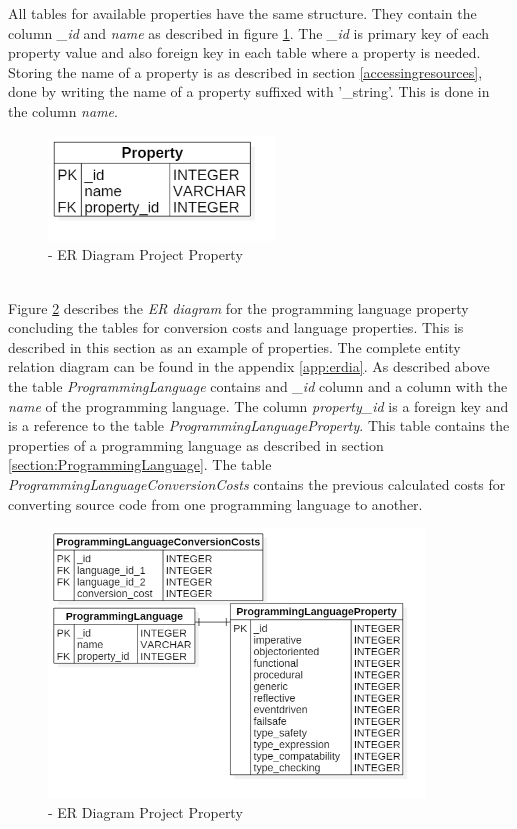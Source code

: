 All tables for available properties have the same structure. They contain the column \textit{\_id} and \textit{name} as described in figure \ref{fig:erproperty}. The \textit{\_id} is primary key of each property value and also foreign key in each table where a property is needed. Storing the name of a property is as described in section \ref{accessingresources}, done by writing the name of a property suffixed with '\_string'. This is done in the column \textit{name}.\\
\begin{figure}[h] 
	\centering 
	\includegraphics[width=6cm]{images/ERProperty.png} 
	\caption{- ER Diagram Project Property} 
	\label{fig:erproperty}
\end{figure}\\
Figure \ref{fig:plproperty} describes the \textit{ER diagram} for the programming language property concluding the tables for conversion costs and language properties. This is described in this section as an example of properties. The complete entity relation diagram can be found in the appendix \ref{app:erdia}. As described above the table \textit{ProgrammingLanguage} contains and \textit{\_id} column and a column with the \textit{name} of the programming language. The column \textit{property\_id} is a foreign key and is a reference to the table \textit{ProgrammingLanguageProperty}. This table contains the properties of a programming language as described in section \ref{section:ProgrammingLanguage}. The table \textit{ProgrammingLanguageConversionCosts} contains the previous calculated costs for converting source code from one programming language to another.  
\begin{figure}[h] 
	\centering 
	\includegraphics[width=10cm]{images/PLProperty.png} 
	\caption{- ER Diagram Project Property} 
	\label{fig:plproperty}
\end{figure}\\

